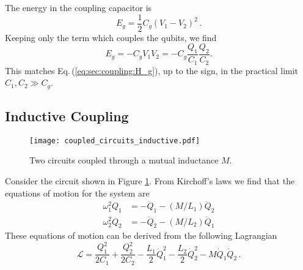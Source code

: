 The energy in the coupling capacitor is
\begin{equation}
E_g = \frac{1}{2} C_g \left( V_1 - V_2 \right)^2 \, . \nonumber
\end{equation}
Keeping only the term which couples the qubits, we find \begin{equation}
E_g = -C_g V_1 V_2 = -C_g \frac{Q_1}{C_1} \frac{Q_2}{C_2} . \end{equation}
This matches Eq.\,(\ref{eq:sec:coupling:H_g}), up to the sign, in the practical limit $C_1,C_2 \gg C_g$.

\subsection{Inductive Coupling}

\begin{figure}
\begin{centering}
\texttt{[image: coupled\_circuits\_inductive.pdf]}
\par\end{centering}
\caption{Two circuits coupled through a mutual inductance $M$.}
\label{Fig:coupledCircuits_inductive}
\end{figure}


Consider the circuit shown in Figure \ref{Fig:coupledCircuits_inductive}.
From Kirchoff's laws we find that the equations of motion for the system are
\begin{align}
\omega_1^2 Q_1 &= -\ddot{Q}_1 - \left(M/L_1\right) \ddot{Q}_2 \\
\omega_2^2 Q_2 &= -\ddot{Q}_2 - \left(M/L_2\right) \ddot{Q}_1
\end{align}
These equations of motion can be derived from the following Lagrangian
\begin{equation}
\mathcal{L} = \frac{Q_1^2}{2 C_1} + \frac{Q_2^2}{2 C_2}
- \frac{L_1}{2}\dot{Q}_1^2
- \frac{L_2}{2}\dot{Q}_2^2
- M \dot{Q}_1 \dot{Q}_2 \, . \label{eq:sec.coupling.subsec.inductiveCoupling:Lagrangian}
\end{equation}

